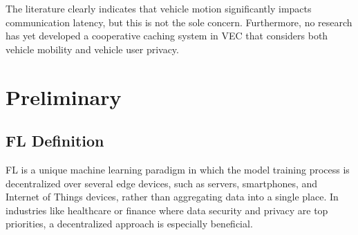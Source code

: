 \documentclass[journal]{IEEEtran}
\begin{document}
The literature clearly indicates that vehicle motion significantly impacts communication latency, but this is not the sole concern. Furthermore, no research has yet developed a cooperative caching system in VEC that considers both vehicle mobility and vehicle user privacy.\par


\section{Preliminary}

\subsection{FL Definition}
FL is a unique machine learning paradigm in which the model training process is decentralized over several edge devices, such as servers, smartphones, and Internet of Things devices, rather than aggregating data into a single place. In industries like healthcare or finance where data security and privacy are top priorities, a decentralized approach is especially beneficial.
\end{document}
